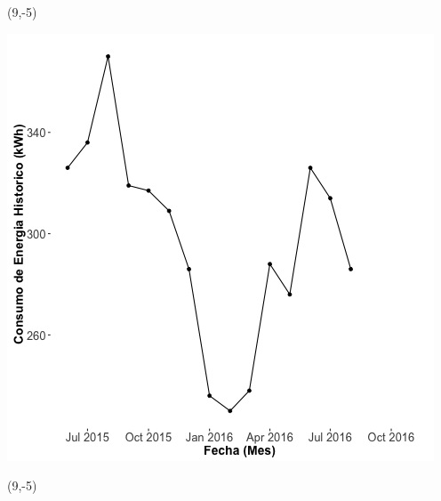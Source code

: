 \documentclass{article}\usepackage[]{graphicx}\usepackage[]{color}
\newenvironment{knitrout}{}{} %
\begin{document}
 \begin{textblock}{1}(9,-5)
\begin{minipage}{20em}
\begingroup

\endgroup
\end{minipage}
\end{textblock}

\begin{knitrout}
\color{fgcolor}
\includegraphics[scale=0.65]{figure/A1_historico_energia} 
\end{knitrout}

 \begin{textblock}{1}(9,-5)
\begin{minipage}{20em}
\begingroup

\endgroup
\end{minipage}
\end{textblock}
\end{document}
